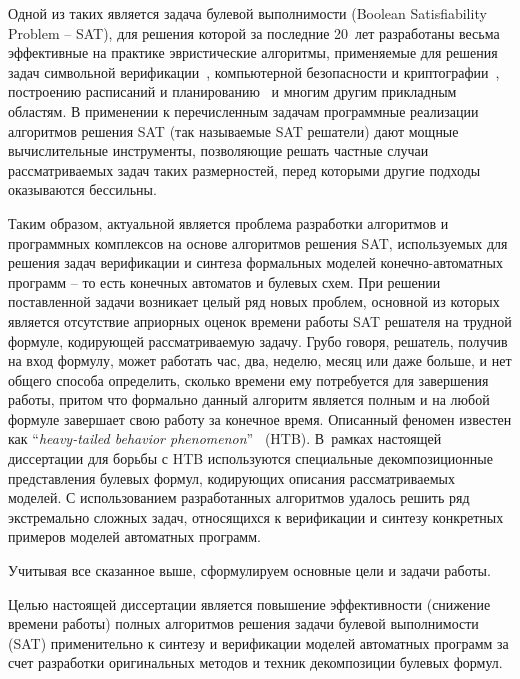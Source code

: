 Одной из таких является задача булевой выполнимости (Boolean Satisfiability Problem \--- SAT), для решения которой за последние 20~лет разработаны весьма эффективные на практике эвристические алгоритмы, применяемые для решения задач символьной верификации~\autocite{kroening2021}, компьютерной безопасности и криптографии~\autocite{bard2009}, построению расписаний и планированию~\autocite{prestwich2021} и многим другим прикладным областям. В применении к перечисленным задачам программные реализации алгоритмов решения SAT (так называемые SAT решатели) дают мощные вычислительные инструменты, позволяющие решать частные случаи рассматриваемых задач таких размерностей, перед которыми другие подходы оказываются бессильны.

Таким образом, актуальной является проблема разработки алгоритмов и программных комплексов на основе алгоритмов решения SAT, используемых для решения задач верификации и синтеза формальных моделей конечно-автоматных программ \--- то есть конечных автоматов и булевых схем.
При решении поставленной задачи возникает целый ряд новых проблем, основной из которых является отсутствие априорных оценок времени работы SAT решателя на трудной формуле, кодирующей рассматриваемую задачу.
Грубо говоря, решатель, получив на вход формулу, может работать час, два, неделю, месяц или даже больше, и нет общего способа определить, сколько времени ему потребуется для завершения работы, притом что формально данный алгоритм является полным и на любой формуле завершает свою работу за конечное время.
Описанный феномен известен как \enquote{\textit{heavy-tailed behavior phenomenon}}~\autocite{gomes2009} (HTB).
В~рамках настоящей диссертации для борьбы с HTB используются специальные декомпозиционные представления булевых формул, кодирующих описания рассматриваемых моделей.
С использованием разработанных алгоритмов удалось решить ряд экстремально сложных задач, относящихся к верификации и синтезу конкретных примеров моделей автоматных программ.

Учитывая все сказанное выше, сформулируем основные цели и задачи работы.


\aim
%
Целью настоящей диссертации является повышение эффективности (снижение времени работы) полных алгоритмов решения задачи булевой выполнимости (SAT) применительно к синтезу и верификации моделей автоматных программ за счет разработки оригинальных методов и техник декомпозиции булевых формул.


